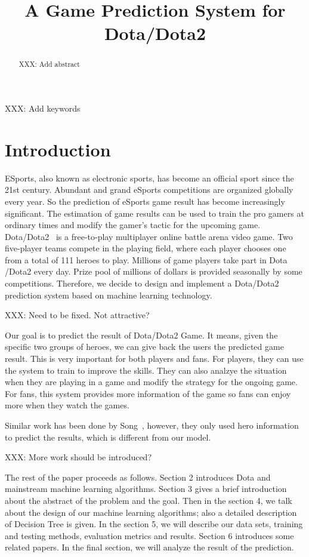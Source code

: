 \documentclass{article}
\title{A Game Prediction System for Dota/Dota2}
\begin{document}
%
\maketitle
%
\begin{abstract}
XXX: Add abstract
\end{abstract}
\begin{keywords}
XXX: Add keywords
\end{keywords}
%
\section{Introduction}

ESports, also known as electronic sports, has become an official sport since the 21st century. Abundant and grand eSports competitions are organized globally every year. So the prediction of eSports game result has become increasingly significant. The estimation of game results can be used to train the pro gamers at ordinary times and modify the gamer’s tactic for the upcoming game. Dota/Dota2~\cite{dotablog} is a free-to-play multiplayer online battle arena video game. Two five-player teams compete in the playing field, where each player chooses one from a total of 111 heroes to play. Millions of game players take part in Dota /Dota2 every day. Prize pool of millions of dollars is provided seasonally by some competitions. Therefore, we decide to design and implement a Dota/Dota2 prediction system based on machine learning technology.

XXX: Need to be fixed. Not attractive?

Our goal is to predict the result of Dota/Dota2 Game. It means, given the specific two groups of heroes, we can give back the users the predicted game result. This is very important for both players and fans. For players, they can use the system to train to improve the skills. They can also analzye the situation when they are playing in a game and modify the strategy for the ongoing game. For fans, this system provides more information of the game so fans can enjoy more when they watch the games. 

Similar work has been done by Song~\cite{semenovapplications}, however, they only used hero information to predict the results, which is different from our model.

XXX: More work should be introduced?

The rest of the paper proceeds as follows. Section 2 introduces Dota and mainstream machine learning algorithms. Section 3 gives a brief introduction about the abstract of the problem and the goal. Then in the section 4, we talk about the design of our machine learning algorithms; also a detailed description of Decision Tree is given. In the section 5, we will describe our data sets, training and testing methods, evaluation metrics and results. Section 6 introduces some related papers. In the final section, we will analyze the result of the prediction.
\end{document}
